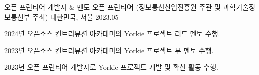 

\begin{cventries}



\cventry
    {오픈 프런티어 개발자 \& 멘토} %
    {오픈 프런티어 (정보통신산업진흥원 주관 및 과학기술정보통신부 주최)} %
    {대한민국, 서울} %
    {2023.05 - } %
    {
      \begin{cvitems} %
        \item {2024년 오픈소스 컨트리뷰션 아카데미의 Yorkie 프로젝트 리드 멘토 수행.}
        \item {2023년 오픈소스 컨트리뷰션 아카데미의 Yorkie 프로젝트 부 멘토 수행.}
        \item {2023년 오픈 프런티어 개발자로 Yorkie 프로젝트 개발 및 확산 활동 수행.}
      \end{cvitems}
    }
    

\end{cventries}

